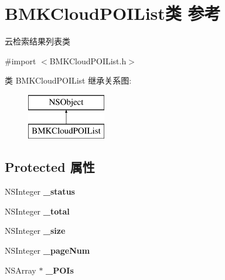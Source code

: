\hypertarget{interface_b_m_k_cloud_p_o_i_list}{}\section{B\+M\+K\+Cloud\+P\+O\+I\+List类 参考}
\label{interface_b_m_k_cloud_p_o_i_list}


云检索结果列表类  




{\ttfamily \#import $<$B\+M\+K\+Cloud\+P\+O\+I\+List.\+h$>$}

类 B\+M\+K\+Cloud\+P\+O\+I\+List 继承关系图\+:\begin{figure}[H]
\begin{center}
\leavevmode
\includegraphics[height=2.000000cm]{interface_b_m_k_cloud_p_o_i_list}
\end{center}
\end{figure}
\subsection*{Protected 属性}
\begin{DoxyCompactItemize}
\item 
\hypertarget{interface_b_m_k_cloud_p_o_i_list_aeb5ee15bcbcfeaceb50cc735bcd5ca88}{}N\+S\+Integer {\bfseries \+\_\+status}\label{interface_b_m_k_cloud_p_o_i_list_aeb5ee15bcbcfeaceb50cc735bcd5ca88}

\item 
\hypertarget{interface_b_m_k_cloud_p_o_i_list_a0dead6846580429a7bca29d4c6336b90}{}N\+S\+Integer {\bfseries \+\_\+total}\label{interface_b_m_k_cloud_p_o_i_list_a0dead6846580429a7bca29d4c6336b90}

\item 
\hypertarget{interface_b_m_k_cloud_p_o_i_list_a43b86ee89f20f0bf99d10140fbc485ca}{}N\+S\+Integer {\bfseries \+\_\+size}\label{interface_b_m_k_cloud_p_o_i_list_a43b86ee89f20f0bf99d10140fbc485ca}

\item 
\hypertarget{interface_b_m_k_cloud_p_o_i_list_a1889b7fae8eef754ecac35daf15e65c6}{}N\+S\+Integer {\bfseries \+\_\+page\+Num}\label{interface_b_m_k_cloud_p_o_i_list_a1889b7fae8eef754ecac35daf15e65c6}

\item 
\hypertarget{interface_b_m_k_cloud_p_o_i_list_a513d425912e3517a7ae9286d8ef39d49}{}N\+S\+Array $\ast$ {\bfseries \+\_\+\+P\+O\+Is}\label{interface_b_m_k_cloud_p_o_i_list_a513d425912e3517a7ae9286d8ef39d49}

\end{DoxyCompactItemize}

